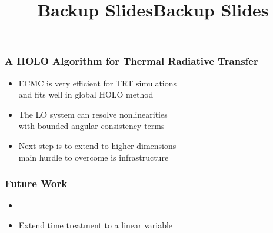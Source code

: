 \documentclass[xcolor=dvipsnames,hyperref={pdfpagelabels=false},unknownkeysallowed]{beamer}
\newcommand{\colG}[1]{{\color{Gray!110} #1}}
\newlength{\wideitemsep}
\let\olditem\item
\renewcommand{\item}{\setlength{\itemsep}{\wideitemsep}\olditem}
\newcommand{\shorttitle}{\color{black} A HOLO Algorithm for Thermal Radiative Transfer
    \makebox[\linewidth]{\rule{\textwidth}{5pt}}
}
\begin{document}
\begin{frame}
    \frametitle{\shorttitle}
    \begin{itemize}
        \item[] ECMC is very efficient for TRT simulations\\
            \colG{and fits well in global HOLO method}
        \item[] The LO system can resolve nonlinearities \\
            \colG{with bounded angular consistency terms}
        \item[] Next step is to extend to higher dimensions \\
            \colG{main hurdle to overcome is infrastructure}
    \end{itemize} \pause
\end{frame}

\begin{frame}
    \frametitle{Future Work}
    \begin{itemize}
        \item[] 
        \item[] Extend time treatment to a linear variable
    \end{itemize}
\end{frame}






\appendix
{}
\setcounter{finalframe}{\value{framenumber}}
\date{}
\title{Backup Slides}
\begin{frame}
    \vspace{-0.21in}
    \titlepage \vspace{-0.2113in}
\end{frame}

\title{Backup Slides}
\author{}
\date{}
\end{document}
